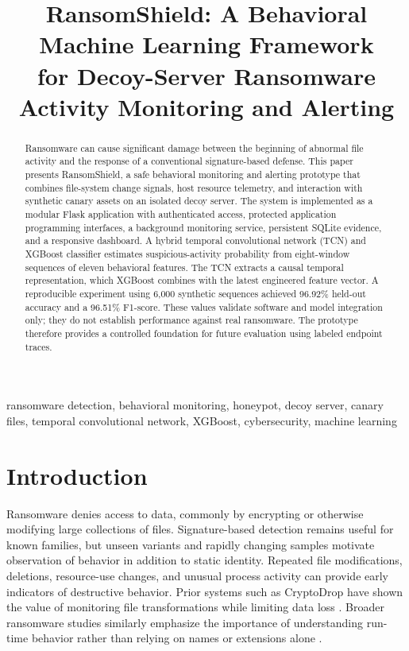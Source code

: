 \documentclass[conference]{IEEEtran}
\title{RansomShield: A Behavioral Machine Learning Framework\\
for Decoy-Server Ransomware Activity Monitoring and Alerting}
\author{
\IEEEauthorblockN{Archana M, Chandan T. N., Gouri K. Patil, and Karan S.}
\IEEEauthorblockA{Department of Computer Science and Engineering\\
Bapuji Institute of Engineering and Technology, Davanagere, India\\
Project Guide: Dr. Usha G. R.}
}
\begin{document}
\maketitle

\begin{abstract}
Ransomware can cause significant damage between the beginning of abnormal file
activity and the response of a conventional signature-based defense. This paper
presents RansomShield, a safe behavioral monitoring and alerting prototype that
combines file-system change signals, host resource telemetry, and interaction
with synthetic canary assets on an isolated decoy server. The system is
implemented as a modular Flask application with authenticated access, protected
application programming interfaces, a background monitoring service, persistent
SQLite evidence, and a responsive dashboard. A hybrid temporal convolutional
network (TCN) and XGBoost classifier estimates suspicious-activity probability
from eight-window sequences of eleven behavioral features. The TCN extracts a
causal temporal representation, which XGBoost combines with the latest engineered
feature vector. A reproducible experiment using 6,000 synthetic sequences achieved
96.92\% held-out accuracy and a 96.51\% F1-score. These values validate software and model
integration only; they do not establish performance against real ransomware. The
prototype therefore provides a controlled foundation for future evaluation using
labeled endpoint traces.
\end{abstract}

\begin{IEEEkeywords}
ransomware detection, behavioral monitoring, honeypot, decoy server, canary files,
temporal convolutional network, XGBoost, cybersecurity, machine learning
\end{IEEEkeywords}

\section{Introduction}
Ransomware denies access to data, commonly by encrypting or otherwise modifying
large collections of files. Signature-based detection remains useful for known
families, but unseen variants and rapidly changing samples motivate observation
of behavior in addition to static identity. Repeated file modifications,
deletions, resource-use changes, and unusual process activity can provide early
indicators of destructive behavior. Prior systems such as CryptoDrop have shown
the value of monitoring file transformations while limiting data loss
\cite{scaife2016cryptodrop}. Broader ransomware studies similarly emphasize the
importance of understanding run-time behavior rather than relying on names or
extensions alone \cite{kharraz2015gordian}.
\end{document}
